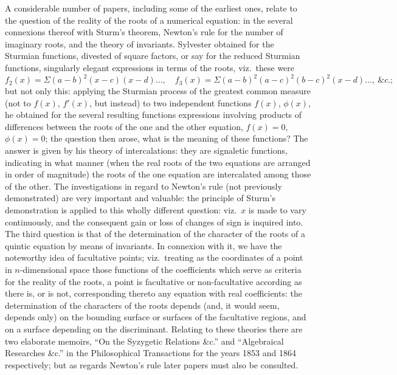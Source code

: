 \documentclass[11pt,a4paper]{article}
\begin{document}
A considerable number of papers, including some of the earliest ones, relate to the question of the reality of the roots of a numerical equation: in the several connexions thereof with Sturm's theorem, Newton's rule for the number of imaginary roots, and the theory of invariants. Sylvester obtained for the Sturmian functions, divested of square factors, or say for the reduced Sturmian functions, singularly elegant expressions in terms of the roots, viz.\ these were
\[
f_2(x) = \Sigma(a-b)^2(x-c)(x-d)\ldots,\quad f_3(x) = \Sigma(a-b)^2(a-c)^2(b-c)^2(x-d)\ldots,\ \&c.;
\]
but not only this: applying the Sturmian process of the greatest common measure (not to $f(x)$, $f'(x)$, but instead) to two independent functions $f(x)$, $\phi(x)$, he obtained for the several resulting functions expressions involving products of differences between the roots of the one and the other equation, $f(x) = 0$, $\phi(x) = 0$; the question then arose, what is the meaning of these functions? The answer is given by his theory of intercalations: they are signaletic functions, indicating in what manner (when the real roots of the two equations are arranged in order of magnitude) the roots of the one equation are intercalated among those of the other. The investigations in regard to Newton's rule (not previously demonstrated) are very important and valuable: the principle of Sturm's demonstration is applied to this wholly different question: viz.\ $x$ is made to vary continuously, and the consequent gain or loss of changes of sign is inquired into. The third question is that of the determination of the character of the roots of a quintic equation by means of invariants. In connexion with it, we have the noteworthy idea of facultative points; viz.\ treating as the coordinates of a point in $n$-dimensional space those functions of the coefficients which serve as criteria for the reality of the roots, a point is facultative or non-facultative according as there is, or is not, corresponding thereto any equation with real coefficients: the determination of the characters of the roots depends (and, it would seem, depends only) on the bounding surface or surfaces of the facultative regions, and on a surface depending on the discriminant. Relating to these theories there are two elaborate memoirs, ``On the Syzygetic Relations \&c.'' and ``Algebraical Researches \&c.'' in the Philosophical Transactions for the years 1853 and 1864 respectively; but as regards Newton's rule later papers must also be consulted.
\end{document}
